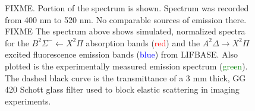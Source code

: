 \begin{figure}

\centering



\caption[CH PLIF Spectrum]{FIXME. Portion of the spectrum is shown. Spectrum was recorded from 400 nm to 520 nm. No comparable sources of emission there. FIXME The spectrum above shows simulated, normalized spectra for the \(B^2\Sigma^-\leftarrow X^2\Pi\) absorption bands (\textcolor{red}{red}) and the \(A^2\Delta\rightarrow X^2\Pi\) excited fluorescence emission bands (\textcolor{blue}{blue}) from LIFBASE. Also plotted is the experimentally measured emission spectrum (\textcolor{green}{green}). The dashed \textcolor{black}{black} curve is the transmittance of a 3 mm thick, GG 420 Schott glass filter used to block elastic scattering in imaging experiments.}

\label{fig:chPLIFSpectrum}

\end{figure}

